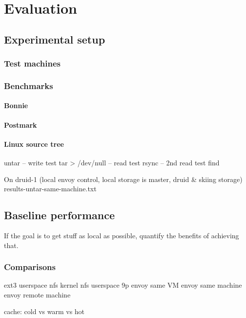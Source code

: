 \chapter{Evaluation}

\section{Experimental setup}

\subsection{Test machines}

\subsection{Benchmarks}

\subsubsection{Bonnie}
\subsubsection{Postmark}

\subsubsection{Linux source tree}
untar -- write test
tar > /dev/null -- read test
rsync -- 2nd read test
find

On druid-1 (local envoy control, local storage is master, druid \& skiing storage)
results-untar-same-machine.txt



\section{Baseline performance}

If the goal is to get stuff as local as possible, quantify the benefits of achieving that.

\subsection{Comparisons}

ext3
userspace nfs
kernel nfs
userspace 9p
envoy same VM
envoy same machine
envoy remote machine

cache: cold vs warm vs hot

